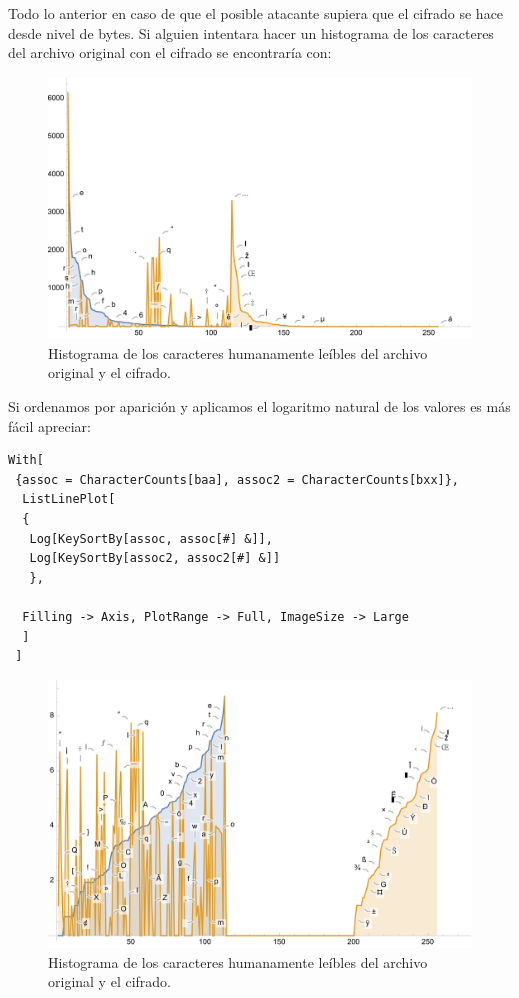 \documentclass[a4paper]{article}
\begin{document}
Todo lo anterior en caso de que el posible atacante supiera que el cifrado se
hace desde nivel de bytes. Si alguien intentara hacer un histograma de los
caracteres del archivo original con el cifrado se encontraría con:

\begin{figure}[H]
    \centering
    \includegraphics[width=\textwidth]{histo2}
    \caption{Histograma de los caracteres humanamente leíbles del archivo
original y el cifrado.}
    \label{fig:Histo2}
\end{figure}

Si ordenamos por aparición y aplicamos el logaritmo natural de los valores es
más fácil apreciar:

\begin{verbatim}
With[
 {assoc = CharacterCounts[baa], assoc2 = CharacterCounts[bxx]},
  ListLinePlot[
  {
   Log[KeySortBy[assoc, assoc[#] &]],
   Log[KeySortBy[assoc2, assoc2[#] &]]
   },
  
  Filling -> Axis, PlotRange -> Full, ImageSize -> Large
  ]
 ]
\end{verbatim}

\begin{figure}[H]
    \centering
    \includegraphics[width=\textwidth]{histo1}
    \caption{Histograma de los caracteres humanamente leíbles del archivo
original y el cifrado.}
    \label{fig:Histo0}
\end{figure}
\end{document}
